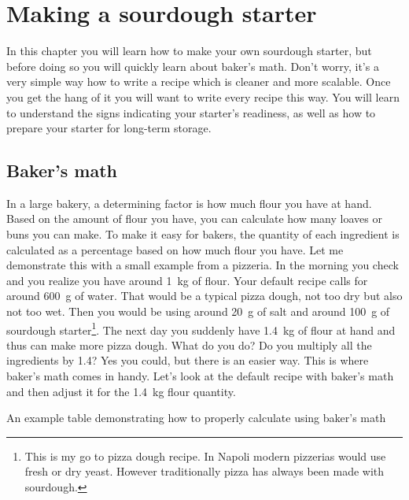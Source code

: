 \chapter{Making a sourdough starter}%
\label{chapter:sourdough-starter}
\begin{quoting}
In this chapter you will learn how to make your
own sourdough starter, but before doing so you will
quickly learn about baker's math. Don't worry,
it's a very simple way how to write a recipe which
is cleaner and more scalable. Once you get the hang
of it you will want to write every recipe this way.
You will learn to understand the signs indicating
your starter's readiness, as well as
how to prepare your starter for long-term storage.
\end{quoting}

\section{Baker's math}%
\label{section:bakers-math}

In a large bakery, a determining factor is how
much flour you have at hand. Based on the amount
of flour you have, you can calculate how many
loaves or buns you can make. To make it easy
for bakers, the quantity of each ingredient
is calculated as a percentage based on how much flour you have.
Let me demonstrate this with a small example from
a pizzeria. In the morning you check and you realize you
have around \qty{1}{\kg} of flour.
Your default recipe calls for around \qty{600}{\gram} of water.
That would be a typical pizza dough, not too dry but
also not too wet. Then you would be using around \qty{20}{\gram}
of salt and around \qty{100}{\gram} of sourdough starter\footnote{This is my go to
pizza dough recipe. In Napoli modern pizzerias would use fresh or dry yeast.
However traditionally pizza has always been made with sourdough.}.
The next day you suddenly have \qty{1.4}{\kg} of flour
at hand and thus can make more pizza dough. What do you do?
Do you multiply all the ingredients by \num{1.4}? Yes you could,
but there is an easier way. This is where baker's math
comes in handy. Let's look at the default recipe with baker's
math and then adjust it for the \qty{1.4}{\kg} flour quantity.

\begin{table}[!htb]
\centering
  
  \caption[Baker's math example]{An example table demonstrating how to
      properly calculate using baker's math}
\end{table}

